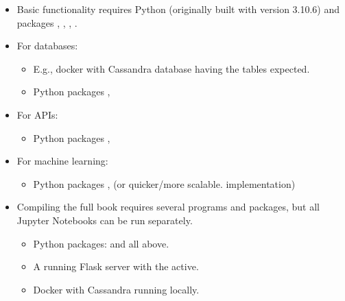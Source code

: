 \documentclass[letterpaper,10pt,english]{jupyterBook}
\begin{document}
\begin{DUlineblock}{0em}
\item[] 
\end{DUlineblock}
\begin{itemize}
\item {} 
\sphinxAtStartPar
Basic functionality requires Python (originally built with version 3.10.6) and packages , , , .

\item {} 
\sphinxAtStartPar
For databases:
\begin{itemize}
\item {} 
\sphinxAtStartPar
E.g., docker with Cassandra database having the tables expected.

\item {} 
\sphinxAtStartPar
Python packages , 

\end{itemize}

\item {} 
\sphinxAtStartPar
For APIs:
\begin{itemize}
\item {} 
\sphinxAtStartPar
Python packages , 

\end{itemize}

\item {} 
\sphinxAtStartPar
For machine learning:
\begin{itemize}
\item {} 
\sphinxAtStartPar
Python packages ,  (or quicker/more scalable. implementation)

\end{itemize}

\item {} 
\sphinxAtStartPar
Compiling the full book requires several programs and packages, but all Jupyter Notebooks can be run separately.
\begin{itemize}
\item {} 
\sphinxAtStartPar
Python packages:  and all above.

\item {} 
\sphinxAtStartPar
A running Flask server with the  active.

\item {} 
\sphinxAtStartPar
Docker with Cassandra running locally.

\end{itemize}

\end{itemize}
\end{document}
